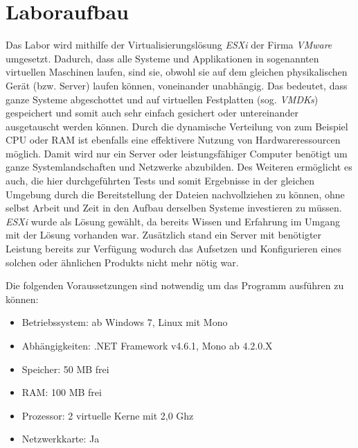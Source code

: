 \section{Laboraufbau} \label{Laboraufbau}
    Das Labor wird mithilfe der Virtualisierungslösung \emph{ESXi} %
    der Firma \emph{VMware} umgesetzt. Dadurch, dass alle Systeme und Applikationen in sogenannten virtuellen Maschinen laufen, sind sie, obwohl sie auf dem gleichen physikalischen Gerät (bzw. Server) laufen können, voneinander unabhängig. Das bedeutet, dass ganze Systeme abgeschottet und auf virtuellen Festplatten (sog. \emph{\acp{VMDK}}) gespeichert und somit auch sehr einfach gesichert oder untereinander ausgetauscht werden können. Durch die dynamische Verteilung von zum Beispiel \ac{CPU} oder RAM ist ebenfalls eine effektivere Nutzung von Hardwareressourcen möglich. Damit wird nur ein Server oder leistungsfähiger Computer benötigt um ganze Systemlandschaften und Netzwerke abzubilden. Des Weiteren ermöglicht es auch, die hier durchgeführten Tests und somit Ergebnisse in der gleichen Umgebung durch die Bereitstellung der Dateien nachvollziehen zu können, ohne selbst Arbeit und Zeit in den Aufbau derselben Systeme investieren zu müssen.
    \emph{ESXi} wurde als Lösung gewählt, da bereits Wissen und Erfahrung im Umgang mit der Lösung vorhanden war. Zusätzlich stand ein Server mit benötigter Leistung bereits zur Verfügung wodurch das Aufsetzen und Konfigurieren eines solchen oder ähnlichen Produkts nicht mehr nötig war.
    
    Die folgenden Voraussetzungen sind notwendig um das Programm ausführen zu können:
    \begin{itemize}
        \item Betriebssystem: ab Windows 7, Linux mit Mono
        \item Abhängigkeiten: .NET Framework v4.6.1, Mono ab 4.2.0.X
        \item Speicher: 50 \ac{MB} frei
        \item RAM: 100 \ac{MB} frei
        \item Prozessor: 2 virtuelle Kerne  mit 2,0 Ghz
        \item Netzwerkkarte: Ja
    \end{itemize}
    
